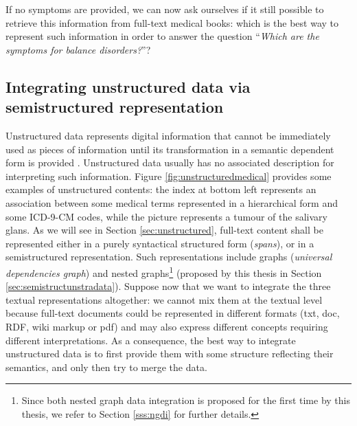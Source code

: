If no symptoms are provided, we can now ask ourselves if it still possible to retrieve this information from full-text medical books: which is the best way to represent such information in order to answer the question ``\textit{Which are the symptoms for balance disorders?}''?



\subsection{Integrating unstructured data via semistructured representation}\label{sec:idifud}
Unstructured data represents digital information that cannot be immediately used as pieces of information until its transformation in a semantic dependent form is provided \cite{OrgKno}. Unstructured data usually has no associated description for interpreting such information. Figure \ref{fig:unstructuredmedical} provides some examples of unstructured contents: the index at bottom left represents an association between some medical terms represented in a hierarchical form and some ICD-9-CM codes, while the picture represents a tumour of the salivary glans. As we will see in Section \vref{sec:unstructured}, full-text content shall be represented either in a purely syntactical structured form (\textit{spans}), or in a semistructured representation. Such representations include graphs (\textit{universal dependencies graph}) and nested graphs\footnote{Since both nested graph data integration is proposed for the first time by this thesis, we refer to Section \vref{sss:ngdi} for further details.} (proposed by this thesis in Section \vref{sec:semistructunstradata}). Suppose now that we want to integrate the three textual representations altogether: we cannot mix them at the textual level because full-text documents could be represented in different formats (txt, doc, RDF, wiki markup or pdf) and may also express different concepts requiring different interpretations. As a consequence, the best way to integrate unstructured data is to first provide them with some structure reflecting their semantics, and only then try to merge the data.
